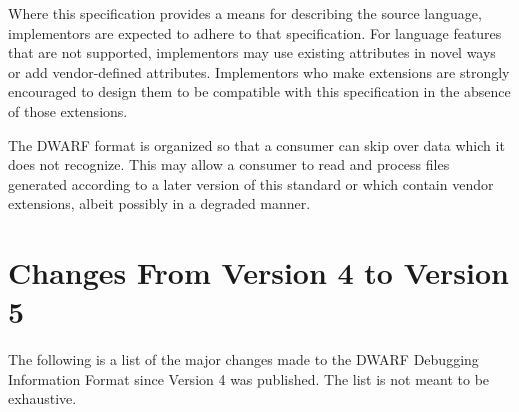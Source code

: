 Where this specification provides a means for
describing the source language, implementors are expected
to adhere to that specification. 
For language features that
are not supported, implementors may use existing attributes
in novel ways or add vendor-defined attributes. 
Implementors
who make extensions are strongly encouraged to design them
to be compatible with this specification in the absence of
those extensions.

The DWARF format is organized so that a consumer can skip over
data which it does not recognize. This may allow a consumer
to read and process files generated according to a later
version of this standard or which contain vendor extensions,
albeit possibly in a degraded manner.

\section{Changes From Version 4 to Version 5}
The following is a list of the major changes made to the 
DWARF Debugging Information Format since Version 4 was published. 
The list is not meant to be exhaustive.

